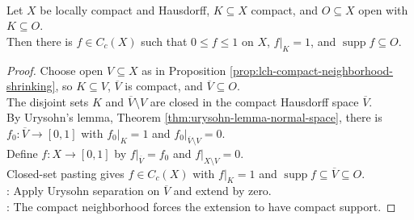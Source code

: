\begin{proposition} \label{prop:lch-compactly-supported-cutoff} \\
Let $X$ be locally compact and Hausdorff, $K\subseteq X$ compact, and $O\subseteq X$ open with $K\subseteq O$.\\
Then there is $f\in C_c(X)$ such that $0\leq f\leq1$ on $X$, $f|_K=1$, and $\operatorname{supp}f\subseteq O$.
\begin{proof} Choose open $V\subseteq X$ as in Proposition \ref{prop:lch-compact-neighborhood-shrinking}, so $K\subseteq V$, $\overline{V}$ is compact, and $\overline{V}\subseteq O$.\\
The disjoint sets $K$ and $\overline{V}\setminus V$ are closed in the compact Hausdorff space $\overline{V}$.\\
By Urysohn's lemma, Theorem \ref{thm:urysohn-lemma-normal-space}, there is $f_0:\overline{V}\to[0,1]$ with $f_0|_K=1$ and $f_0|_{\overline{V}\setminus V}=0$.\\
Define $f:X\to[0,1]$ by $f|_{\overline{V}}=f_0$ and $f|_{X\setminus V}=0$.\\
Closed-set pasting gives $f\in C_c(X)$ with $f|_K=1$ and $\operatorname{supp}f\subseteq\overline{V}\subseteq O$.\\
: Apply Urysohn separation on $\overline{V}$ and extend by zero.\\
: The compact neighborhood forces the extension to have compact support.
\end{proof}
\end{proposition}

